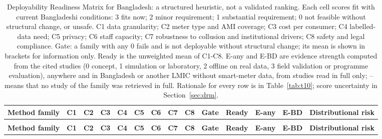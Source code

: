 \begingroup
\scriptsize
\renewcommand{\arraystretch}{1.12}
\setlength{\tabcolsep}{3pt}
\begin{xltabular}{\textwidth}{>{\raggedright\arraybackslash{}\hsize}X>{\centering\arraybackslash{}\hsize}X>{\centering\arraybackslash{}\hsize}X>{\centering\arraybackslash{}\hsize}X>{\centering\arraybackslash{}\hsize}X>{\centering\arraybackslash{}\hsize}X>{\centering\arraybackslash{}\hsize}X>{\centering\arraybackslash{}\hsize}X>{\centering\arraybackslash{}\hsize}X>{\centering\arraybackslash{}\hsize}X>{\centering\arraybackslash{}\hsize}X>{\centering\arraybackslash{}\hsize}X>{\centering\arraybackslash{}\hsize}X>{\centering\arraybackslash{}\hsize}X}
\caption{Deployability Readiness Matrix for Bangladesh: a structured heuristic, not a validated ranking. Each cell scores fit with current Bangladeshi conditions: 3 fits now; 2 minor requirement; 1 substantial requirement; 0 not feasible without structural change, or unsafe. C1 data granularity; C2 meter type and AMI coverage; C3 cost per consumer; C4 labelled-data need; C5 privacy; C6 staff capacity; C7 robustness to collusion and institutional drivers; C8 safety and legal compliance. Gate: a family with any 0 fails and is not deployable without structural change; its mean is shown in brackets for information only. Ready is the unweighted mean of C1-C8. E-any and E-BD are evidence strength computed from the cited studies (0 concept, 1 simulation or laboratory, 2 offline on real data, 3 field validation or programme evaluation), anywhere and in Bangladesh or another LMIC without smart-meter data, from studies read in full only; -- means that no study of the family was retrieved in full. Rationale for every row is in Table~\ref{tab:t10}; score uncertainty in Section~\ref{sec:drm}.}\label{tab:t8} \\
\toprule
\textbf{Method family} & \textbf{C1} & \textbf{C2} & \textbf{C3} & \textbf{C4} & \textbf{C5} & \textbf{C6} & \textbf{C7} & \textbf{C8} & \textbf{Gate} & \textbf{Ready} & \textbf{E-any} & \textbf{E-BD} & \textbf{Distributional risk} \\
\midrule
\endfirsthead
{} \\
\toprule
\textbf{Method family} & \textbf{C1} & \textbf{C2} & \textbf{C3} & \textbf{C4} & \textbf{C5} & \textbf{C6} & \textbf{C7} & \textbf{C8} & \textbf{Gate} & \textbf{Ready} & \textbf{E-any} & \textbf{E-BD} & \textbf{Distributional risk} \\

\end{xltabular}
